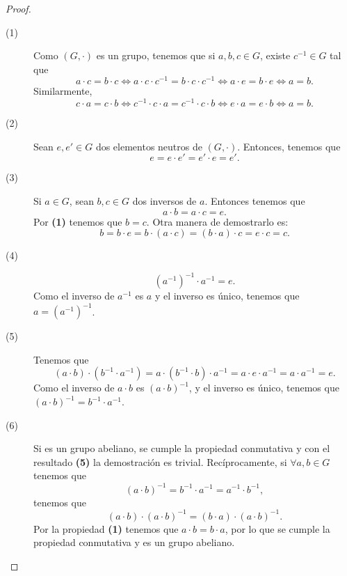 \begin{proof}
\begin{description}
\item[(1)] Como $\displaystyle \left(G, \cdot\right) $ es un grupo, tenemos que si $\displaystyle a, b, c \in G $, existe $\displaystyle c^{-1} \in G $ tal que 
	\[a \cdot c = b \cdot c \iff a \cdot c \cdot c^{-1} = b \cdot c \cdot c^{-1} \iff a \cdot e = b \cdot e \iff a = b .\]
Similarmente, 
\[c \cdot a = c \cdot b \iff c^{-1} \cdot c \cdot a = c^{-1} \cdot c \cdot b \iff e \cdot a = e \cdot b \iff a = b .\]
\item[(2)] Sean $\displaystyle e, e' \in G $ dos elementos neutros de $\displaystyle \left(G, \cdot\right) $. Entonces, tenemos que 
	\[ e = e \cdot e' = e' \cdot e = e' .\]
\item[(3)] Si $\displaystyle a \in G $, sean $\displaystyle b, c \in G $ dos inversos de $\displaystyle a $. Entonces tenemos que 
	\[a \cdot b = a \cdot c = e .\]
Por \textbf{(1)} tenemos que $\displaystyle b = c $. Otra manera de demostrarlo es:
\[b = b \cdot e = b \cdot \left(a \cdot c\right) = \left(b \cdot a \right) \cdot c = e \cdot c = c .\]
\item[(4)] 
	\[\left(a^{-1}\right)^{-1} \cdot a^{-1} = e .\]
Como el inverso de $\displaystyle a^{-1} $ es $\displaystyle a $ y el inverso es único, tenemos que $\displaystyle a = \left(a^{-1}\right)^{-1} $. 
\item[(5)] Tenemos que 
	\[\left(a \cdot b\right) \cdot \left(b^{-1} \cdot a^{-1}\right) = a \cdot \left(b^{-1} \cdot b\right) \cdot a^{-1} = a \cdot e \cdot a^{-1} = a \cdot a^{-1} = e .\]
	Como el inverso de $\displaystyle a \cdot b $ es $\displaystyle \left(a \cdot b\right)^{-1} $, y el inverso es único, tenemos que $\displaystyle \left(a \cdot b\right)^{-1} = b^{-1} \cdot a^{-1} $.
\item[(6)] Si es un grupo abeliano, se cumple la propiedad conmutativa y con el resultado \textbf{(5)} la demostración es trivial. Recíprocamente, si $\displaystyle \forall a, b \in G $ tenemos que 
	\[\left(a \cdot b\right) ^{-1} = b^{-1} \cdot a^{-1} = a^{-1} \cdot b^{-1} ,\]
tenemos que 
\[ \left(a \cdot b\right) \cdot \left(a \cdot b\right)^{-1} = \left( b \cdot a\right) \cdot\left(a \cdot b\right)^{-1} .\]
Por la propiedad \textbf{(1)} tenemos que $\displaystyle a \cdot b = b \cdot a $, por lo que se cumple la propiedad conmutativa y es un grupo abeliano. 
\end{description}
\end{proof}

